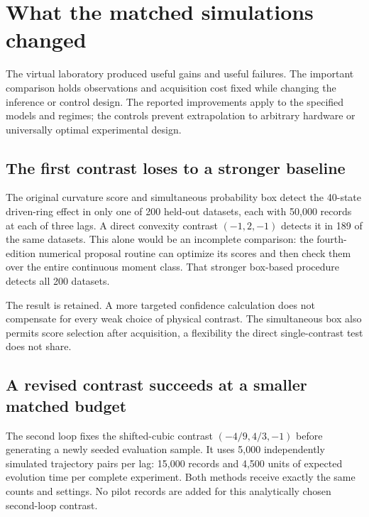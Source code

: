 \chapter{What the matched simulations changed}
\label{vl:benchmark}

The virtual laboratory produced useful gains and useful failures. The important
comparison holds observations and acquisition cost fixed while changing the
inference or control design. The reported improvements apply to the specified
models and regimes; the controls prevent extrapolation to arbitrary hardware
or universally optimal experimental design.

\section{The first contrast loses to a stronger baseline}
The original curvature score and simultaneous probability box detect the
40-state driven-ring effect in only one of 200 held-out datasets, each with
50,000 records at each of three lags. A direct convexity contrast
$(-1,2,-1)$ detects it in 189 of the same datasets. This alone would be an
incomplete comparison: the fourth-edition numerical proposal routine can
optimize its scores and then check them over the entire continuous moment
class. That stronger box-based procedure detects all 200 datasets.

The result is retained. A more targeted confidence calculation does not
compensate for every weak choice of physical contrast. The simultaneous box
also permits score selection after acquisition, a flexibility the direct
single-contrast test does not share.

\section{A revised contrast succeeds at a smaller matched budget}
The second loop fixes the shifted-cubic contrast
$(-4/9,4/3,-1)$ before generating a newly seeded evaluation sample. It uses
5,000 independently simulated trajectory pairs per lag: 15,000 records and
4,500 units of expected evolution time per complete experiment. Both methods
receive exactly the same counts and settings. No pilot records are added for
this analytically chosen second-loop contrast.

